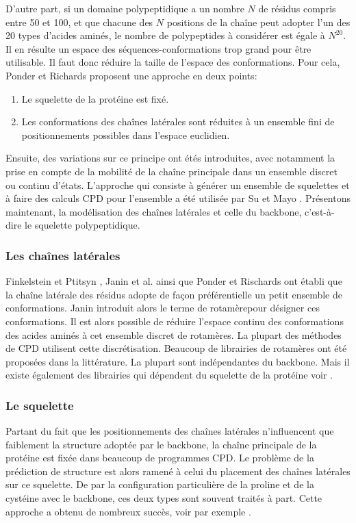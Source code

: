 D'autre part, si un domaine polypeptidique a un nombre $N$ de résidus compris entre 50 et 100, et que chacune des $N$ positions de la chaîne peut adopter l'un des 20 types d'acides aminés, le nombre de polypeptides à considérer est égale à  $N^{20}$. Il en résulte un espace des séquences-conformations trop grand pour être utilisable. Il faut donc réduire la taille de l'espace des conformations. Pour cela, Ponder et Richards \cite{Ponder87} proposent une approche en deux points:
\begin{enumerate}[leftmargin=*]
\item Le squelette de la protéine est fixé.
\item Les conformations des chaînes latérales sont réduites à un ensemble fini de positionnements possibles dans l'espace euclidien.
\end{enumerate}  
Ensuite, des variations sur ce principe ont étés introduites, avec notamment la prise en compte de la mobilité de la chaîne principale dans un ensemble discret ou continu d'états. L'approche qui consiste à générer un ensemble de squelettes et à faire des calculs CPD pour l'ensemble a été utilisée par Su et Mayo \cite{Su97}. 
Présentons maintenant, la modélisation des chaînes latérales et celle du backbone, c'est-à-dire le squelette polypeptidique.

\subsubsection{Les chaînes latérales}

Finkelstein et Ptitsyn \cite{Finkelstein77}, Janin et al. \cite{Janin78} ainsi que Ponder et Rischards \cite{Ponder87} ont établi que la chaîne latérale des résidus adopte de façon préférentielle un petit ensemble de conformations. Janin introduit alors le terme de \og rotamère\fg pour désigner ces conformations. Il est alors possible de réduire l'espace continu des conformations des acides aminés à cet ensemble discret de rotamères. La plupart des méthodes de CPD utilisent cette discrétisation. Beaucoup de librairies de rotamères ont été proposées dans la littérature. La plupart sont indépendantes du backbone. Mais il existe également des librairies qui dépendent du squelette de la protéine voir \cite{McGregor87,Dunbrack93}. 

\subsubsection{Le squelette}
Partant du fait que les positionnements des chaînes latérales n'influencent que faiblement la structure adoptée par le backbone, la chaîne principale de la protéine est fixée dans beaucoup de programmes CPD. Le problème de la prédiction de structure est alors ramené à celui du placement des chaînes latérales sur ce squelette. De par la configuration particulière de la proline et de la cystéine avec le backbone, ces deux types sont souvent traités à part. Cette approche a obtenu de nombreux succès, voir par exemple \cite{Dahiyat97b}.

